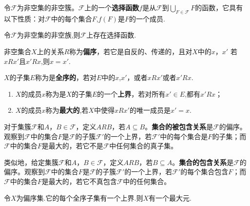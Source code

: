 \documentclass[lang=cn,newtx,10pt,scheme=chinese]{elegantbook}
\begin{document}
\begin{definition}[选择函数]\label{definition:选择函数}
  令\(\mathcal{F}\)为非空集的非空簇。\(\mathcal{F}\)上的一个\textbf{选择函数}\(f\)是从\(\mathcal{F}\)到\(\bigcup_{F\in\mathcal{F}}F\)的函数，它具有以下性质：对\(\mathcal{F}\)中的每个集合\(F\),\(f(F)\)是\(F\)的一个成员.
\end{definition}

\begin{axiom}[Zermelo选择公理]\label{axiom:Zermelo选择公理}
  令\(\mathcal{F}\)为非空集的非空族,则\(\mathcal{F}\)上存在选择函数.
\end{axiom}

\begin{definition}[序关系]\label{definition:序关系}
  非空集合\(X\)上的关系\(R\)称为\textbf{偏序}，若它是自反的、传递的，且对\(X\)中的\(x\)，\(x'\) 
若\(xRx'\)且\(x'Rx\),则\(x = x'\).

\(X\)的子集\(E\)称为是\textbf{全序的}，若对\(E\)中的\(x\),\(x'\)，或者\(xRx'\)或者\(x'Rx\).
\begin{enumerate}
  \item \(X\)的成员\(x\)称为是\(X\)的子集\(E\)的一个\textbf{上界}，若对所有\(x'\in E\),都有\(x'Rx\)；
  
  \item \(X\)的成员\(x\)称为\textbf{最大的},若\(X\)中使得\(xRx'\)的唯一成员是\(x' = x\).
\end{enumerate}
\end{definition}
\begin{note}
对于集簇\(\mathcal{F}\)和\(A\)，\(B\in\mathcal{F}\)，定义\(ARB\)，若\(A\subseteq B\)。\textbf{集合的被包含关系}是\(\mathcal{F}\)的偏序。观察到\(\mathcal{F}\)中的集合\(F\)是\(\mathcal{F}\)的子簇\(\mathcal{F}'\)的一个上界，若\(\mathcal{F}'\)中的每个集合是\(F\)的子集；而\(\mathcal{F}\)中的集合\(F\)是最大的，若它不是\(\mathcal{F}\)中任何集合的真子集。

类似地，给定集簇\(\mathcal{F}\)和\(A\)，\(B\in\mathcal{F}\)，定义\(ARB\)，若\(B\subseteq A\)。\textbf{集合的包含关系}是\(\mathcal{F}\)的偏序。观察到\(\mathcal{F}\)中的集合\(F\)是\(\mathcal{F}\)的子簇\(\mathcal{F}'\)的一个上界，若\(\mathcal{F}'\)的每个集合包含\(F\)；而\(\mathcal{F}\)中的集合\(F\)是最大的，若它不真包含\(\mathcal{F}\)中的任何集合。
\end{note}



\begin{lemma}[Zorn引理]\label{theorem:Zorn引理}
  令\(X\)为偏序集.它的每个全序子集有一个上界.则\(X\)有一个最大元.
\end{lemma}
\end{document}
